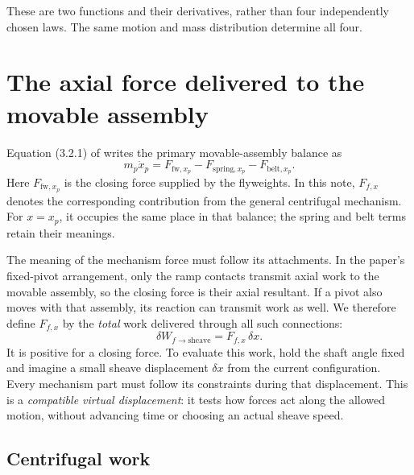 \documentclass[11pt,letterpaper]{article}
\numberwithin{equation}{section}
\newcommand{\source}{\cite{formulation}}
\begin{document}
These are two functions and their derivatives, rather than four independently chosen laws. The same motion and mass distribution determine all four.

\section{The axial force delivered to the movable assembly}
\label{sec:axial}

Equation (3.2.1) of \source{} writes the primary movable-assembly balance as
\begin{equation}
  m_p\ddot x_p=F_{\mathrm{fw},x_p}
                  -F_{\mathrm{spring},x_p}-F_{\mathrm{belt},x_p}.
  \label{eq:paper-axial}
\end{equation}
Here $F_{\mathrm{fw},x_p}$ is the closing force supplied by the flyweights. In this note, $F_{f,x}$ denotes the corresponding contribution from the general centrifugal mechanism. For $x=x_p$, it occupies the same place in that balance; the spring and belt terms retain their meanings.

The meaning of the mechanism force must follow its attachments. In the paper's fixed-pivot arrangement, only the ramp contacts transmit axial work to the movable assembly, so the closing force is their axial resultant. If a pivot also moves with that assembly, its reaction can transmit work as well. We therefore define $F_{f,x}$ by the \emph{total} work delivered through all such connections:
\begin{equation}
  \delta W_{f\to\mathrm{sheave}}=F_{f,x}\,\delta x.
  \label{eq:force-work-definition}
\end{equation}
It is positive for a closing force. To evaluate this work, hold the shaft angle fixed and imagine a small sheave displacement $\delta x$ from the current configuration. Every mechanism part must follow its constraints during that displacement. This is a \emph{compatible virtual displacement}: it tests how forces act along the allowed motion, without advancing time or choosing an actual sheave speed.

\subsection{Centrifugal work}
\end{document}
